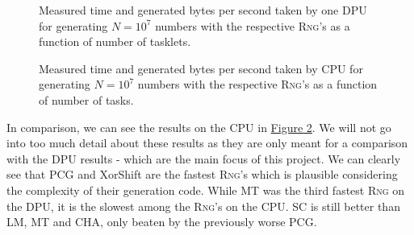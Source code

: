 \documentclass[a4paper]{scrartcl}
\begin{document}
\begin{figure}[!htb] \label{fig:1}
    \caption{
        Measured time and generated bytes per second taken by one DPU for generating $N = 10^7$ numbers with the respective \textsc{Rng}'s as a function of number of tasklets.        
    }    
\end{figure}

\begin{figure}[!htb] \label{fig:2}
    \caption{
        Measured time and generated bytes per second taken by CPU for generating $N = 10^7$ numbers with the respective \textsc{Rng}'s as a function of number of tasks.        
    }    
\end{figure}

\clearpage
In comparison, we can see the results on the CPU in \hyperref[fig:2]{Figure 2}.
We will not go into too much detail about these results as they are only meant for a comparison with the DPU results - which are the main focus of this project.
We can clearly see that PCG and XorShift are the fastest \textsc{Rng}'s which is plausible considering the complexity of their generation code.
While MT was the third fastest \textsc{Rng} on the DPU, it is the slowest among the \textsc{Rng}'s on the CPU.
SC is still better than LM, MT and CHA, only beaten by the previously worse PCG.
\end{document}
